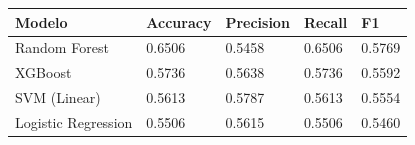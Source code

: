 \begin{tabular}{lllll}
\toprule
Modelo & Accuracy & Precision & Recall & F1 \\
\midrule
Random Forest & 0.6506 & 0.5458 & 0.6506 & 0.5769 \\
XGBoost & 0.5736 & 0.5638 & 0.5736 & 0.5592 \\
SVM (Linear) & 0.5613 & 0.5787 & 0.5613 & 0.5554 \\
Logistic Regression & 0.5506 & 0.5615 & 0.5506 & 0.5460 \\
\bottomrule
\end{tabular}
